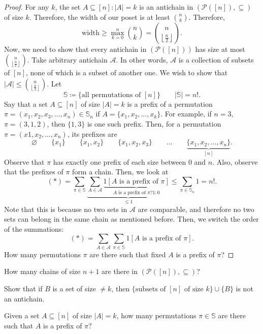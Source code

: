 \documentclass[a4paper]{article}
\begin{document}
\begin{proof}
	For any \( k \), the set \( A \subseteq [n] \colon |A| = k \) is an antichain in \( (\mathcal{P}([n]), \subseteq) \) of size \( k \). Therefore, the width of our poset is at least \( \binom{n}{k} \). Therefore, \[
		\text{width} \ge \max_{k=0}^{n}\binom{n}{k} = \binom{n}{\left\lfloor \frac{n}{2} \right\rfloor }
	.\] Now, we need to show that every antichain in \( (\mathcal{P}([n])) \) has size at most \( \binom{n}{\left\lfloor \frac{n}{2} \right\rfloor} \). Take arbitrary antichain \( \mathcal{A} \). In other words, \( \mathcal{A} \) is a collection of subsets of \( [n] \), none of which is a subset of another one. We wish to show that \( |\mathcal{A}| \le \binom{n}{\left\lfloor \frac{n}{2} \right\rfloor} \). Let 
	\[
		\mathbb{S} \coloneq \{\text{all permutations of }[n]\}  \qquad |\mathbb{S}| = n!
	.\] 
	Say that a set \( A \subseteq [n] \) of size \( |A| = k \) is a prefix of a permutation \( \pi =(x_{1},x_{2},x_{3},\ldots ,x_n) \in \mathbb{S}_n \) if \( A=\{x_{1},x_{2},\ldots ,x_k\}   \). For example, if \( n=3 \), \( \pi =(3,1,2) \), then \( \{1,3\}   \) is one such prefix. Then, for a permutation \( \pi =(x1,x_{2},\ldots ,x_n) \), its prefixes are \[
		\varnothing \qquad \{x_{1}\} \qquad \{x_{1},x_{2}\} \qquad \{x_{1},x_{2},x_{3}\} \qquad \ldots \qquad \underbrace{\{x_{1},x_{2},\ldots ,x_{n}\}}_{[n]}
	.\] Observe that \( \pi  \) has exactly one prefix of each size between \( 0 \) and \( n \). Also, observe that the prefixes of \( \pi  \) form a chain. Then, we look at \[
	(*) = \sum_{\pi \in \mathbb{S}} \underbrace{\sum_{A \in \mathcal{A}} \underbrace{1[A \text{ is a prefix of } \pi ]}_{A \text{ is a prefix of } \pi ? 1 : 0}}_{\le 1} \le \sum_{\pi  \in \mathbb{S}_n} 1 = n!
	.\] Note that this is because no two sets in \( \mathcal{A} \) are comparable, and therefore no two sets can belong in the same chain as mentioned before. Then, we switch the order of the summations: \[
	(*) = \sum_{A \in \mathcal{A}} \sum_{\pi  \in \mathbb{S}} 1[A \text{ is a prefix of } \pi ]
	.\] How many permutations \( \pi  \) are there such that fixed \( A \) is a prefix of \( \pi  \)?
\end{proof}

How many chains of size \( n+1 \) are there in \( (\mathcal{P}([n]), \subseteq) \)?

Show that if \( B \) is a set of size \( \neq k \), then \(\{\text{subsets of } [n] \text{ of size } k \}  \cup \{B\}\) is not an antichain.

Given a set \( A \subseteq [n] \) of size \( |A|=k \), how many permutations \( \pi  \in \mathbb{S} \) are there such that \( A  \) is a prefix of \( \pi  \)?
\end{document}
